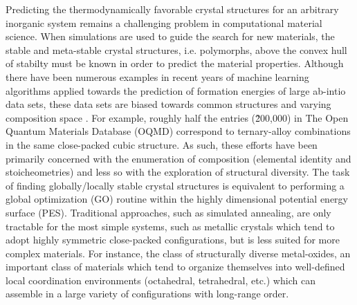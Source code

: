 Predicting the thermodynamically favorable crystal structures for an arbitrary inorganic system remains a challenging problem in computational material science.\cite{}
%
%
When simulations are used to guide the search for new materials, the stable and meta-stable crystal structures, i.e. polymorphs,  above the convex hull of stabilty must be known in order to predict the material properties.\cite{}
Although there have been numerous examples in recent years of machine learning algorithms applied towards the prediction of formation energies of large ab-intio data sets, these data sets are biased towards common structures and varying composition space .\cite{}
%
For example, roughly half the entries (\~200,000) in The Open Quantum Materials Database (OQMD) correspond to ternary-alloy combinations in the same close-packed cubic structure.
As such, these efforts have been primarily concerned with the enumeration of composition (elemental identity and stoicheometries) and less so with the exploration of structural diversity.
%
The task of finding globally/locally stable crystal structures is equivalent to performing a global optimization (GO) routine within the highly dimensional potential energy surface (PES).
%
Traditional approaches, such as simulated annealing, are only tractable for the most simple systems,
such as metallic crystals which tend to adopt highly symmetric close-packed configurations, but is less suited for more complex materials.
%
For instance, the class of structurally diverse metal-oxides, an important class of materials which tend to organize themselves into well-defined local coordination environments (octahedral, tetrahedral, etc.) which can assemble in a large variety of configurations with long-range order.
